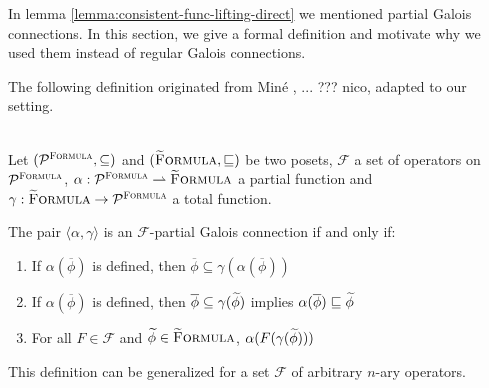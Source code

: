 In lemma \ref{lemma:consistent-func-lifting-direct} we mentioned partial Galois connections.
In this section, we give a formal definition and motivate why we used them instead of regular Galois connections.

The following definition originated from Miné \cite{mine2004weakly}, ... ??? nico, adapted to our setting.
\begin{definition}\label{def:pgc} ~\\
    Let $(\mathcal{P}^{\textup{\textsc{Formula}}}, \subseteq)$ and $(\textup{\textsc{\ensuremath{\widetilde{\text{F}}}ormula}}, \sqsubseteq)$ be two posets, $\mathcal{F}$ a set of operators on $\mathcal{P}^{\textup{\textsc{Formula}}}$, $\alpha : \mathcal{P}^{\textup{\textsc{Formula}}} \rightharpoonup \textup{\textsc{\ensuremath{\widetilde{\text{F}}}ormula}}$ a partial function and $\gamma : \textup{\textsc{\ensuremath{\widetilde{\text{F}}}ormula}} \rightarrow \mathcal{P}^{\textup{\textsc{Formula}}}$ a total function. 
    
    The pair $\langle \alpha, \gamma \rangle$ is an $\mathcal{F}$-partial Galois connection if and only if:
    \begin{enumerate}
        \item If $\alpha(\overline{\phi})$ is defined, then $\overline{\phi} \subseteq \gamma(\alpha(\overline{\phi}))$
        \item If $\alpha(\overline{\phi})$ is defined, then $\overline{\phi} \subseteq \gamma(\widetilde{\phi})$ implies $\alpha(\overline{\phi}) \sqsubseteq \widetilde{\phi}$
        \item For all $F \in \mathcal{F}$ and $\widetilde{\phi} \in \textup{\textsc{\ensuremath{\widetilde{\text{F}}}ormula}}$, $\alpha(F(\gamma(\widetilde{\phi})))$
    \end{enumerate}
This definition can be generalized for a set $\mathcal{F}$ of arbitrary $n$-ary operators.
\end{definition}

